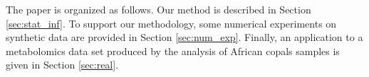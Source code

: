 The paper is organized as follows. Our method is described in Section \ref{sec:stat_inf}.
To support our methodology, some numerical experiments on synthetic data are provided in Section \ref{sec:num_exp}.
Finally, an application to a metabolomics data set produced by the analysis of African
copals samples is given in Section \ref{sec:real}. 


